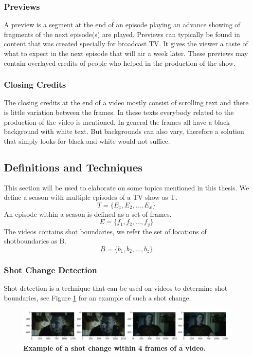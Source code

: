 \documentclass{article}
\begin{document}
\subsubsection{Previews}
A preview is a segment at the end of an episode playing an advance showing of fragments of the next episode(s) are played. Previews can typically be found in content that was created specially for broadcast TV. It gives the viewer a taste of what to expect in the next episode that will air a week later. These previews may contain overlayed credits of people who helped in the production of the show.

\subsubsection{Closing Credits}
The closing credits at the end of a video mostly consist of scrolling text and there is little variation between the frames. In these texts everybody related to the production of the video is mentioned. In general the frames all have a black background with white text. But backgrounds can also vary, therefore a solution that simply looks for black and white would not suffice.

\subsection{Definitions and Techniques}
This section will be used to elaborate on some topics mentioned in this thesis. We define a season with multiple episodes of a TV-show as T.
\[T = \{E_1, E_2, \dots, E_x\}\]
An episode within a season is defined as a set of frames.
\[E = \{f_1, f_2, \dots, f_y\}\]
The videos contains shot boundaries, we refer the set of locations of shotboundaries as B.
\[B = \{b_1, b_2, \dots, b_z\}\]

\subsubsection{Shot Change Detection}

Shot detection is a technique that can be used on videos to determine shot boundaries, see Figure \ref{shotchange} for an example of such a shot change. 

\begin{figure}[H]
	\includegraphics[width=12cm]{images/shotchange.jpg}
	\centering
	\caption{\textbf{Example of a shot change within 4 frames of a video.}}
	\label{shotchange}
\end{figure}
\end{document}
